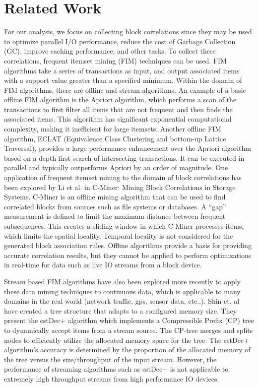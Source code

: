\documentclass[MEng]{uofl}
\begin{document}
\blockofcontents

\chapter{Related Work}
For our analysis, we focus on collecting block correlations since they may be used to optimize parallel I/O performance, reduce the cost of Garbage Collection (GC), improve caching performance, and other tasks. To collect these correlations, frequent itemset mining (FIM) techniques can be used. FIM algorithms take a series of transactions as input, and output associated items with a support value greater than a specified minimum.  Within the domain of FIM algorithms, there are offline and stream algorithms. An example of a basic offline FIM algorithm is the Apriori algorithm, which performs a scan of the transactions to first filter all items that are not frequent and then finds the associated items. This algorithm has significant exponential computational complexity, making it inefficient for large itemsets. Another offline FIM algorithm, ECLAT (Equivalence Class Clustering and bottom-up Lattice Traversal), provides a large performance enhancement over the Apriori algorithm based on a depth-first search of intersecting transactions. It can be executed in parallel and typically outperforms Apriori by an order of magnitude. One application of frequent itemset mining to the domain of block correlations has been explored by Li et al. in C-Miner: Mining Block Correlations in Storage Systems. C-Miner is an offline mining algorithm that can be used to find correlated blocks from sources such as file systems or databases. A “gap” measurement is defined to limit the maximum distance between frequent subsequences. This creates a sliding window in which C-Miner processes items, which limits the spatial locality. Temporal locality is not considered for the generated block association rules. Offline algorithms provide a basis for providing accurate correlation results, but they cannot be applied to perform optimizations in real-time for data such as live IO streams from a block device.

Stream based FIM algorithms have also been explored more recently to apply these data mining techniques to continuous data, which is applicable to many domains in the real world (network traffic, gps, sensor data, etc..). Shin et. al have created a tree structure that adapts to a configured memory size. They present the estDec+ algorithm which implements a Compressible Prefix (CP) tree to dynamically accept items from a stream source. The CP-tree merges and splits nodes to efficiently utilize the allocated memory space for the tree. The estDec+ algorithm’s accuracy is determined by the proportion of the allocated memory of the tree versus the size/throughput of the input stream.  However, the performance of streaming algorithms such as estDec+ is not applicable to extremely high throughput streams from high performance IO devices. 
\end{document}
